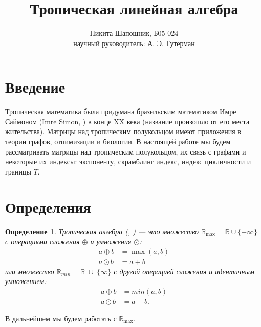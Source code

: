 \documentclass[12pt]{article}
\title{Тропическая линейная алгебра}
\author{Никита Шапошник, Б05-024\\ научный руководитель: А. Э. Гутерман}
\date{}
\newtheorem{definition}[theorem]{Определение}
\begin{document}
\maketitle
\section{Введение}
Тропическая математика была придумана бразильским математиком Имре Саймоном (Imre Simon, \cite{ImreSimon}) в конце XX века (название произошло от его места жительства). Матрицы над тропическим полукольцом имеют приложения в теории графов, отпимизации и биологии. В настоящей работе мы будем рассматривать матрицы над тропическим полукольцом, их связь с графами и некоторые их индексы: экспоненту, скрамблинг индекс, индекс цикличности и границы $T$.

\section{Определения}
\begin{definition}
Тропическая алгебра (\cite{glanceOnTropicalLA},
        \cite{tropicalMath}) --- это множество $\mathbb{R}_{\max} = \mathbb{R} \cup \{ -\infty\}$ с операциями сложения $\oplus$ и умножения $\odot$: \begin{align*}
            a \oplus b &= \max(a, b)\\
            a \odot b &= a + b
        \end{align*}      
        или множество $\mathbb{R}_{min} = \mathbb{R} \; \cup \; \{ \infty\}$ с другой операцией сложения и идентичным умножением: \begin{align*}
            a \oplus b &= min(a, b)\\
            a \odot b &= a + b.
        \end{align*}
\end{definition}

В дальнейшем мы будем работать с $\mathbb{R}_{\max}$.
\end{document}
